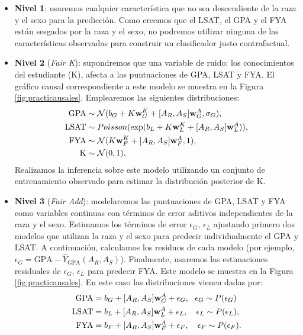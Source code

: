 \documentclass[oneside,openright,titlepage,numbers=noenddot,openany,headinclude,footinclude=true,
cleardoublepage=empty,abstractoff,BCOR=5mm,paper=a4,fontsize=12pt,main=spanish]{scrreprt}
\begin{document}
\begin{itemize}
    \item \textbf{Nivel 1}: usaremos cualquier característica que no sea descendiente de la raza y el sexo para la predicción. Como creemos que el LSAT, el GPA y el FYA están sesgados por la raza y el sexo, no podremos utilizar ninguna de las características observadas para construir un clasificador justo contrafactual.
    
    \item \textbf{Nivel 2} (\textit{Fair K}): supondremos que una variable de ruido: los conocimientos del estudiante (K), afecta a las puntuaciones de GPA, LSAT y FYA. El gráfico causal correspondiente a este modelo se muestra en la Figura \ref{fig:practicausales}. Emplearemos las siguientes distribuciones:
    \begin{equation*}
    \begin{split}
        \text{GPA} &\sim \mathcal{N}(b_G+K \textbf{w}^K_G+[A_R,A_S] \textbf{w}^A_G, \sigma_G),\\
        \text{LSAT} &\sim Poisson(\text{exp}(b_L+K \textbf{w}^K_L +[A_R,A_S] \textbf{w}^A_L)),\\ 
        \text{FYA}&\sim \mathcal{N}(K \textbf{w}^K_F+[A_R,A_S] \textbf{w}^A_F, 1),\\
        \text{K}&\sim \mathcal{N}(0,1).
    \end{split}
    \end{equation*}
    Realizamos la inferencia sobre este modelo utilizando un conjunto de entrenamiento observado para estimar la distribución posterior de K.
    
    \item \textbf{Nivel 3} (\textit{Fair Add}): modelaremos las puntuaciones de GPA, LSAT y FYA como variables continuas con términos de error aditivos independientes de la raza y el sexo. Estimamos los términos de error $\epsilon_G$, $\epsilon_L$ ajustando primero dos modelos que utilizan la raza y el sexo para predecir individualmente el GPA y LSAT. A continuación, calculamos los residuos de cada modelo (por ejemplo, $\epsilon_G =\text{GPA}-\hat{Y}_{\text{GPA}}(A_R, A_S)$). Finalmente, usaremos las estimaciones residuales de $\epsilon_G$, $\epsilon_L$ para predecir FYA. Este modelo se muestra en la Figura \ref{fig:practicausales}. En este caso las distribuciones vienen dadas por:
    \begin{equation*}
    \begin{split}
        \text{GPA} &= b_G+[A_R,A_S] \nm{w}^A_G +\epsilon_G, \ \ \epsilon_G \sim P(\epsilon_G)\\
        \text{LSAT} &= b_L+[A_R,A_S] \nm{w}^A_L +\epsilon_L, \quad \epsilon_L \sim P(\epsilon_L),\\
        \text{FYA}&= b_F+[A_R,A_S] \nm{w}^A_F +\epsilon_F, \quad \epsilon_F \sim P(\epsilon_F).
    \end{split}
    \end{equation*}
\end{itemize}\
\end{document}
